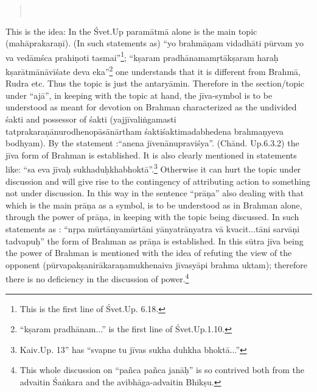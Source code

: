 \begin{verse}
\\
\end{verse}


This is the idea: In the Śvet.Up paramātmā alone is the main topic (mahāprakaraṇī). (In such statements as) “yo brahmāṇam vidadhāti pūrvam yo va vedāmśca prahiṇoti  tasmai”\footnote{This is the first line of Śvet.Up. 6.18.}; “kṣaram pradhānamamṛ\-tākṣaram haraḥ kṣarātmānāvīśate deva eka”\footnote{“kṣaram pradhānam...” is the first line of  Śvet.Up.1.10.} one understands that it is different from Brahmā, Rudra etc. Thus the topic is just the antaryāmin. Therefore in the section/topic under “ajā”, in keeping with the topic at hand, the jīva-symbol is to be understood as meant for devotion on Brahman characterized as the undivided śakti and possessor of śakti (yajjīvaliṅgamasti tatprakaraṇānurodhenopāsānārtham śaktiśaktimadabhedena brahmaṇyeva bodhyam). By the statement :\break “anena jīvenānupraviśya”. (Chānd. Up.6.3.2) the jīva form of Brahman is established. It is also clearly mentioned in statements like: “sa eva jīvaḥ sukhaduḥkhabhoktā”.\footnote{Kaiv.Up. 13” has “svapne tu jīvas sukha duhkha bhoktā...”} Otherwise it can hurt the topic under discussion and will give rise to the contingency of attributing action to something not under discussion.  In this way in the sentence “prāṇa” also dealing with that which is the main prāṇa as a symbol, is to be understood as in Brahman alone, through the power of prāṇa, in keeping with the topic being discussed. In such statements as : “nṛpa mūrtānyamūrtāni yānyatrānyatra vā kvacit...tāni sarvāṇi tadvapuḥ” the form of Brahman as prāṇa is established. In this sūtra jīva being the power of Brahman is mentioned with the idea of refuting the view of the opponent (pūrvapakṣanirākaraṇamukhenaiva jīvasyāpi brahma uktam); therefore there is no deficiency in the discussion of power.\footnote{This whole discussion on “pañca pañca janāḥ” is so contrived both from the advaitin Śaṅkara  and the avibhāga-advaitin Bhikṣu.}



